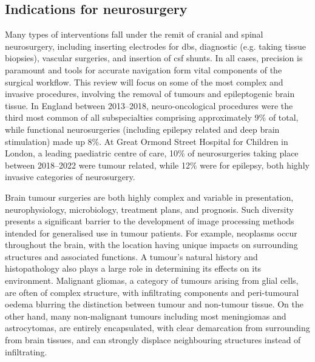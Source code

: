\subsection{Indications for neurosurgery}


Many types of interventions fall under the remit of cranial and spinal neurosurgery, including inserting electrodes for \gls{dbs}, diagnostic (e.g. taking tissue biopsies), vascular surgeries, and insertion of \gls{csf} shunts.
In all cases, precision is paramount and tools for accurate navigation form vital components of the surgical workflow.
This review will focus on some of the most complex and invasive procedures, involving the removal of tumours and epileptogenic brain tissue.
In England between 2013--2018, neuro-oncological procedures were the third most common of all subspecialties comprising approximately 9\% of total, while functional neurosurgeries (including epilepsy related and deep brain stimulation) made up 8\%\autocite{Wahba2022}.
At Great Ormond Street Hospital for Children in London, a leading paediatric centre of care, 10\% of neurosurgeries taking place between 2018--2022 were tumour related, while 12\% were for epilepsy, both highly invasive categories of neurosurgery\autocite{gosh2023}.

Brain tumour surgeries are both highly complex and variable in presentation, neurophysiology, microbiology, treatment plans, and prognosis.
Such diversity presents a significant barrier to the development of image processing methods intended for generalised use in tumour patients.
For example, neoplasms occur throughout the brain, with the location having unique impacts on surrounding structures and associated functions.
A tumour's natural history and histopathology also plays a large role in determining its effects on its environment.
Malignant gliomas, a category of tumours arising from glial cells, are often of complex structure, with infiltrating components and peri-tumoural oedema blurring the distinction between tumour and non-tumour tissue.
On the other hand, many non-malignant tumours including most meningiomas and astrocytomas, are entirely encapsulated, with clear demarcation from surrounding from brain tissues, and can strongly displace neighbouring structures instead of infiltrating.

